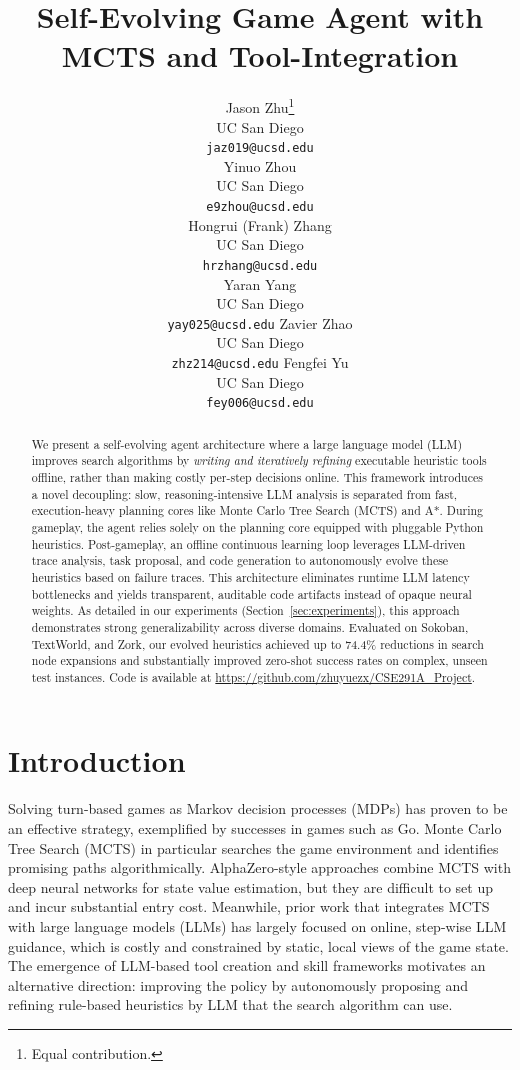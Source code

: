 \documentclass{article}
\title{Self-Evolving Game Agent with MCTS and Tool-Integration}
\author{%
  Jason Zhu\thanks{Equal contribution.} \\
  UC San Diego\\
  \texttt{jaz019@ucsd.edu} \\
  \And
  Yinuo Zhou\footnotemark[1] \\
  UC San Diego\\
  \texttt{e9zhou@ucsd.edu} \\
  \And
  Hongrui (Frank) Zhang\footnotemark[1] \\
  UC San Diego\\
  \texttt{hrzhang@ucsd.edu} \\
  \And
  Yaran Yang\footnotemark[1] \\
  UC San Diego\\
\texttt{yay025@ucsd.edu}
  \And
  Zavier Zhao\footnotemark[1] \\
  UC San Diego\\
  \texttt{zhz214@ucsd.edu}
  \And
  Fengfei Yu\footnotemark[1] \\
  UC San Diego\\
  \texttt{fey006@ucsd.edu}
}
\begin{document}
\maketitle


\begin{abstract}
We present a self-evolving agent architecture where a large language model (LLM) improves search algorithms by \emph{writing and iteratively refining} executable heuristic tools offline, rather than making costly per-step decisions online. This framework introduces a novel decoupling: slow, reasoning-intensive LLM analysis is separated from fast, execution-heavy planning cores like Monte Carlo Tree Search (MCTS) and A*. During gameplay, the agent relies solely on the planning core equipped with pluggable Python heuristics. Post-gameplay, an offline continuous learning loop leverages LLM-driven trace analysis, task proposal, and code generation to autonomously evolve these heuristics based on failure traces. This architecture eliminates runtime LLM latency bottlenecks and yields transparent, auditable code artifacts instead of opaque neural weights. As detailed in our experiments (Section~\ref{sec:experiments}), this approach demonstrates strong generalizability across diverse domains. Evaluated on Sokoban, TextWorld, and Zork, our evolved heuristics achieved up to 74.4\% reductions in search node expansions and substantially improved zero-shot success rates on complex, unseen test instances. Code is available at \url{https://github.com/zhuyuezx/CSE291A_Project}.
\end{abstract}


\section{Introduction}
\label{sec:intro}

Solving turn-based games as Markov decision processes (MDPs) has proven to be an effective strategy, exemplified by successes in games such as Go. Monte Carlo Tree Search (MCTS) in particular searches the game environment and identifies promising paths algorithmically. AlphaZero-style approaches combine MCTS with deep neural networks for state value estimation, but they are difficult to set up and incur substantial entry cost. Meanwhile, prior work that integrates MCTS with large language models (LLMs) has largely focused on online, step-wise LLM guidance, which is costly and constrained by static, local views of the game state. The emergence of LLM-based tool creation and skill frameworks motivates an alternative direction: improving the policy by autonomously proposing and refining rule-based heuristics by LLM that the search algorithm can use.
\end{document}
